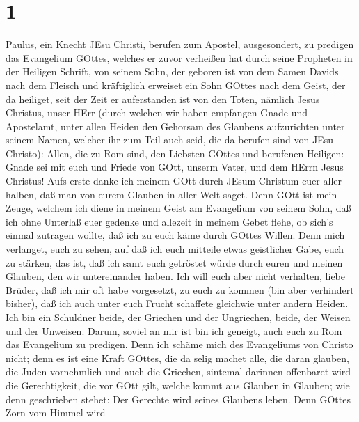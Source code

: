 \hypertarget{section}{%
\section{1}\label{section}}

 Paulus, ein Knecht JEsu Christi, berufen zum Apostel,
ausgesondert, zu predigen das Evangelium GOttes,  welches er
zuvor verheißen hat durch seine Propheten in der Heiligen Schrift,
 von seinem Sohn, der geboren ist von dem Samen Davids nach
dem Fleisch  und kräftiglich erweiset ein Sohn GOttes nach
dem Geist, der da heiliget, seit der Zeit er auferstanden ist von den
Toten, nämlich Jesus Christus, unser HErr  (durch welchen
wir haben empfangen Gnade und Apostelamt, unter allen Heiden den
Gehorsam des Glaubens aufzurichten unter seinem Namen, 
welcher ihr zum Teil auch seid, die da berufen sind von JEsu Christo):
 Allen, die zu Rom sind, den Liebsten GOttes und berufenen
Heiligen: Gnade sei mit euch und Friede von GOtt, unserm Vater, und dem
HErrn Jesus Christus!  Aufs erste danke ich meinem GOtt
durch JEsum Christum euer aller halben, daß man von eurem Glauben in
aller Welt saget.  Denn GOtt ist mein Zeuge, welchem ich
diene in meinem Geist am Evangelium von seinem Sohn, daß ich ohne
Unterlaß euer gedenke  und allezeit in meinem Gebet flehe,
ob sich's einmal zutragen wollte, daß ich zu euch käme durch GOttes
Willen.  Denn mich verlanget, euch zu sehen, auf daß ich
euch mitteile etwas geistlicher Gabe, euch zu stärken,  das
ist, daß ich samt euch getröstet würde durch euren und meinen Glauben,
den wir untereinander haben.  Ich will euch aber nicht
verhalten, liebe Brüder, daß ich mir oft habe vorgesetzt, zu euch zu
kommen (bin aber verhindert bisher), daß ich auch unter euch Frucht
schaffete gleichwie unter andern Heiden.  Ich bin ein
Schuldner beide, der Griechen und der Ungriechen, beide, der Weisen und
der Unweisen.  Darum, soviel an mir ist bin ich geneigt,
auch euch zu Rom das Evangelium zu predigen.  Denn ich
schäme mich des Evangeliums von Christo nicht; denn es ist eine Kraft
GOttes, die da selig machet alle, die daran glauben, die Juden
vornehmlich und auch die Griechen,  sintemal darinnen
offenbaret wird die Gerechtigkeit, die vor GOtt gilt, welche kommt aus
Glauben in Glauben; wie denn geschrieben stehet: Der Gerechte wird
seines Glaubens leben.  Denn GOttes Zorn vom Himmel wird
